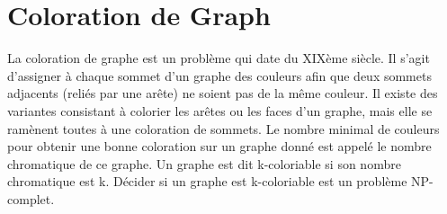 \section{Coloration de Graph}

La coloration de graphe est un problème qui date du XIXème siècle.
Il s'agit d'assigner à chaque sommet d'un graphe des couleurs afin que deux sommets adjacents (reliés par une arête) ne soient pas de la même couleur. Il existe des variantes consistant à colorier les arêtes ou les faces d'un graphe, mais elle se ramènent toutes à une coloration de sommets. Le nombre minimal de couleurs pour obtenir une bonne coloration sur un graphe donné est appelé le nombre chromatique de ce graphe. Un graphe est dit k-coloriable si son nombre chromatique est k. Décider si un graphe est k-coloriable est un problème NP-complet.
